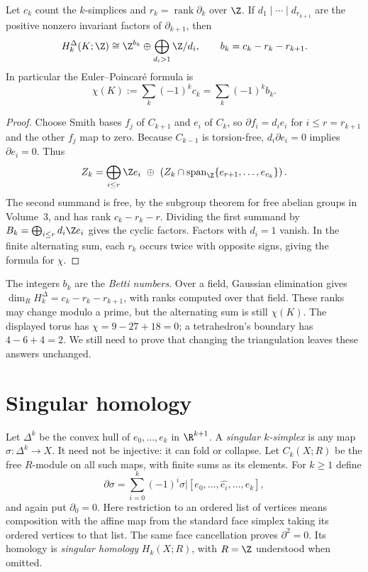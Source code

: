 \begin{proposition}\label{prop:smithhomology}
Let $c_k$ count the $k$-simplices and $r_k=\operatorname{rank}\partial_k$ over $\Z$. If $d_1\mid\cdots\mid d_{r_{k+1}}$ are the positive nonzero invariant factors of $\partial_{k+1}$, then
\[
H_k^\Delta(K;\Z)\cong\Z^{b_k}\oplus\bigoplus_{d_i>1}\Z/d_i,
\qquad b_k=c_k-r_k-r_{k+1}.
\]
In particular the Euler--Poincar\'e formula is
\[
\chi(K):=\sum_k(-1)^kc_k=\sum_k(-1)^kb_k.
\]
\end{proposition}

\begin{proof}
Choose Smith bases $f_j$ of $C_{k+1}$ and $e_i$ of $C_k$, so $\partial f_i=d_ie_i$ for $i\le r=r_{k+1}$ and the other $f_j$ map to zero. Because $C_{k-1}$ is torsion-free, $d_i\partial e_i=0$ implies $\partial e_i=0$. Thus
\[
Z_k=\bigoplus_{i\le r}\Z e_i\ \oplus\
\left(Z_k\cap\operatorname{span}_{\Z}\{e_{r+1},\ldots,e_{c_k}\}\right).
\]
The second summand is free, by the subgroup theorem for free abelian groups in Volume~3, and has rank $c_k-r_k-r$. Dividing the first summand by $B_k=\bigoplus_{i\le r}d_i\Z e_i$ gives the cyclic factors. Factors with $d_i=1$ vanish. In the finite alternating sum, each $r_k$ occurs twice with opposite signs, giving the formula for $\chi$.
\end{proof}

The integers $b_k$ are the \emph{Betti numbers}. Over a field, Gaussian elimination gives $\dim_RH_k^\Delta=c_k-r_k-r_{k+1}$, with ranks computed over that field. These ranks may change modulo a prime, but the alternating sum is still $\chi(K)$. The displayed torus has $\chi=9-27+18=0$; a tetrahedron's boundary has $4-6+4=2$. We still need to prove that changing the triangulation leaves these answers unchanged.

\section{Singular homology}

Let $\Delta^k$ be the convex hull of $e_0,\ldots,e_k$ in $\R^{k+1}$. A \emph{singular $k$-simplex} is any map $\sigma:\Delta^k\to X$. It need not be injective: it can fold or collapse. Let $C_k(X;R)$ be the free $R$-module on all such maps, with finite sums as its elements. For $k\ge1$ define
\[
\partial\sigma=\sum_{i=0}^k(-1)^i\sigma|[e_0,\ldots,\widehat{e_i},\ldots,e_k],
\]
and again put $\partial_0=0$. Here restriction to an ordered list of vertices means composition with the affine map from the standard face simplex taking its ordered vertices to that list. The same face cancellation proves $\partial^2=0$. Its homology is \emph{singular homology} $H_k(X;R)$, with $R=\Z$ understood when omitted.

